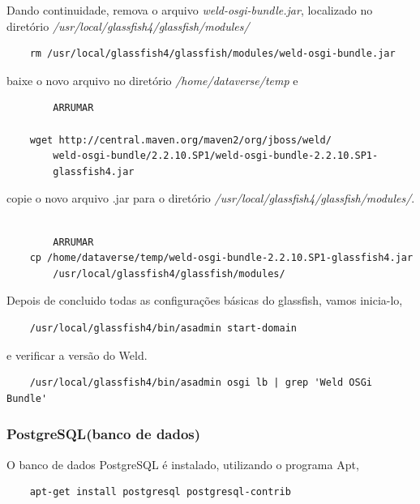 \documentclass[12pt,hidelinks]{article}
\begin{document}
        Dando continuidade, remova o arquivo \textit{weld-osgi-bundle.jar}, localizado no diretório \textit{/usr/local/glassfish4/glassfish/modules/}
        \begin{verbatim}
    rm /usr/local/glassfish4/glassfish/modules/weld-osgi-bundle.jar
        \end{verbatim}
        baixe o novo arquivo no diretório \textit{/home/dataverse/temp} e 
        \begin{verbatim}
        ARRUMAR
        
    wget http://central.maven.org/maven2/org/jboss/weld/
        weld-osgi-bundle/2.2.10.SP1/weld-osgi-bundle-2.2.10.SP1-
        glassfish4.jar
        \end{verbatim}
        copie o novo arquivo .jar para o diretório \textit{/usr/local/glassfish4/glassfish/modules/}. 
        \begin{verbatim}
        
        ARRUMAR
    cp /home/dataverse/temp/weld-osgi-bundle-2.2.10.SP1-glassfish4.jar 
        /usr/local/glassfish4/glassfish/modules/
        \end{verbatim}
        
        Depois de concluido todas as configurações básicas do glassfish, vamos inicia-lo,    
        \begin{verbatim} 
    /usr/local/glassfish4/bin/asadmin start-domain
        \end{verbatim}
        e verificar a versão do Weld.
        \begin{verbatim} 
    /usr/local/glassfish4/bin/asadmin osgi lb | grep 'Weld OSGi Bundle'
        \end{verbatim}
        
        
        \subsubsection{PostgreSQL(banco de dados)}
        
        \qquad O banco de dados PostgreSQL é instalado, utilizando o programa Apt, 
        \begin{verbatim} 
    apt-get install postgresql postgresql-contrib
        \end{verbatim}
        
\end{document}
